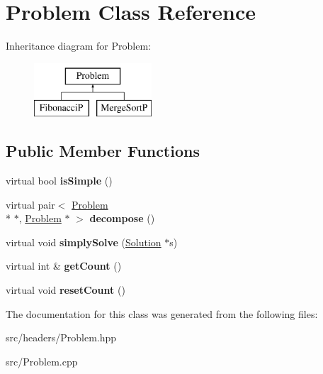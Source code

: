 \hypertarget{classProblem}{\section{Problem Class Reference}
\label{classProblem}
}
Inheritance diagram for Problem\-:\begin{figure}[H]
\begin{center}
\leavevmode
\includegraphics[height=2.000000cm]{classProblem}
\end{center}
\end{figure}
\subsection*{Public Member Functions}
\begin{DoxyCompactItemize}
\item 
\hypertarget{classProblem_abac3f602fb70288f129c6cbd8286c7b8}{virtual bool {\bfseries is\-Simple} ()}\label{classProblem_abac3f602fb70288f129c6cbd8286c7b8}

\item 
\hypertarget{classProblem_a92f3e992bcaef1abc58841515a758099}{virtual pair$<$ \hyperlink{classProblem}{Problem} \\*
$\ast$, \hyperlink{classProblem}{Problem} $\ast$ $>$ {\bfseries decompose} ()}\label{classProblem_a92f3e992bcaef1abc58841515a758099}

\item 
\hypertarget{classProblem_a342fcc85680fbc4f1a0396c25377ad81}{virtual void {\bfseries simply\-Solve} (\hyperlink{classSolution}{Solution} $\ast$s)}\label{classProblem_a342fcc85680fbc4f1a0396c25377ad81}

\item 
\hypertarget{classProblem_a64a4bd847dc5fcc78693898338bd9d8d}{virtual int \& {\bfseries get\-Count} ()}\label{classProblem_a64a4bd847dc5fcc78693898338bd9d8d}

\item 
\hypertarget{classProblem_a75980148545f29b70a746ad86fab590d}{virtual void {\bfseries reset\-Count} ()}\label{classProblem_a75980148545f29b70a746ad86fab590d}

\end{DoxyCompactItemize}


The documentation for this class was generated from the following files\-:\begin{DoxyCompactItemize}
\item 
src/headers/Problem.\-hpp\item 
src/Problem.\-cpp\end{DoxyCompactItemize}

